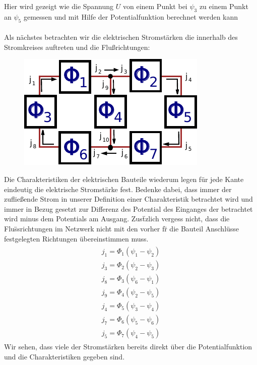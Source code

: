 \documentclass[11pt,a4paper,leqno]{report}
\numberwithin{equation}{chapter}
\begin{document}
\noindent
Hier wird gezeigt wie die Spannung $U$ von einem Punkt bei $\psi_3$ zu einem Punkt an $\psi_5$ gemessen und mit Hilfe der Potentialfunktion berechnet werden kann\\
\\
Als n\"achstes betrachten wir die elektrischen Stromst\"arken die innerhalb des Stromkreises auftreten und die Flu\ss{}richtungen: 
\begin{figure}[H]
	\begin{center}
		\includegraphics[scale=1]{laminar.pdf}
	\end{center}
\end{figure}
\noindent
Die Charakteristiken der elektrischen Bauteile wiederum legen f\"ur jede Kante eindeutig die elektrische Stromst\"arke fest. Bedenke dabei, dass immer der zuflie\ss{}ende Strom in unserer Definition einer Charakteristik betrachtet wird und immer in Bezug gesetzt zur Differenz des Potential des Einganges der betrachtet wird minus dem Potentials am Ausgang. Zus\"tzlich vergess nicht, dass die Flu\"ss{}richtungen im Netzwerk nicht mit den vorher f\"r die Bauteil Anschl\"usse festgelegten Richtungen \"ubereinstimmen muss.\\
\begin{align} 
\begin{split}
j_1 = \Phi_1(\psi_1 - \psi_2)\\
j_3 = \Phi_2(\psi_2 - \psi_3)\\
j_8 = \Phi_3(\psi_6 - \psi_1)\\
j_9 = \Phi_4(\psi_2 - \psi_5)\\
j_4 = \Phi_5(\psi_3 - \psi_4)\\
j_7 = \Phi_6(\psi_5 - \psi_6)\\
j_5 = \Phi_7(\psi_4 - \psi_5)
\end{split}
\end{align}
Wir sehen, dass viele der Stromst\"arken bereits direkt \"uber die Potentialfunktion und die Charakteristiken gegeben sind. \\
\end{document}
